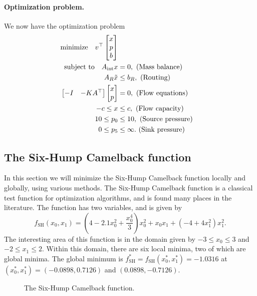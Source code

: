 \paragraph{Optimization problem.} We now have the optimization problem
\begin{subequations}
\begin{align}
\mathrm{minimize} \ \ \  v^\top \begin{bmatrix} x \\ p \\ b\end{bmatrix} \\
\mathrm{subject\ to} \ \ \  A_{\mathrm{int}}x &= 0,\ \mathrm{(Mass\ balance)} \\
A_R \tilde{x} &\leq b_R,\ \mathrm{(Routing)} \\
\begin{bmatrix} -I & -K A^\top \end{bmatrix} \begin{bmatrix} x \\ p \end{bmatrix} &= 0,\ \mathrm{(Flow\ equations)} \\
-c \leq x &\leq c,\ \mathrm{(Flow\ capacity)} \\
10 \leq p_0 &\leq 10,\ \mathrm{(Source\ pressure)}\\
0 \leq p_5 &\leq \infty.\ \mathrm{(Sink\ pressure)}
\end{align}
\end{subequations}


\newpage
\subsection{The Six-Hump Camelback function}
In this section we will minimize the Six-Hump Camelback function locally and globally, using various methods. The Six-Hump Camelback function is a classical test function for optimization algorithms, and is found many places in the literature. The function has two variables, and is given by
\begin{equation}
f_{\mathrm{SH}}(x_0, x_1) = \left( 4 - 2.1x_0^2 + \frac{x_0^4}{3} \right)x_0^2 + x_0x_1 + (-4 + 4x_1^2) x_1^2.
\label{eqn:schb}
\end{equation}
The interesting area of this function is in the domain given by $-3 \leq x_0 \leq 3$ and $-2 \leq x_1 \leq 2$. Within this domain, there are six local minima, two of which are global minima. The global minimum is $f_{\mathrm{SH}}^* = f_{\mathrm{SH}}(x_0^*, x_1^*) = -1.0316$ at $(x_0^*, x_1^*) = (-0.0898, 0.7126)$ and $(0.0898, -0.7126)$.
\begin{figure}[H]
\centering
{}
\caption{The Six-Hump Camelback function.}
\end{figure}

